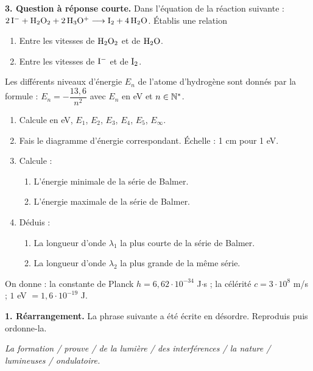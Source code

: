 \documentclass[11pt]{article}
\begin{document}
\medskip
\noindent\textbf{3. Question à réponse courte.} Dans l'équation de la réaction suivante : $\mathrm{2\,I^- + H_2O_2 + 2\,H_3O^+ \longrightarrow I_2 + 4\,H_2O}$. Établis une relation
\begin{enumerate}[label=\alph*.]
  \item Entre les vitesses de $\mathrm{H_2O_2}$ et de $\mathrm{H_2O}$.
  \item Entre les vitesses de $\mathrm{I^-}$ et de $\mathrm{I_2}$.
\end{enumerate}

Les différents niveaux d'énergie $E_n$ de l'atome d'hydrogène sont donnés par la formule : $E_n = -\dfrac{13{,}6}{n^2}$ avec $E_n$ en eV et $n \in \mathbb{N}^*$.

\begin{enumerate}
  \item Calcule en eV, $E_1$, $E_2$, $E_3$, $E_4$, $E_5$, $E_\infty$.
  \item Fais le diagramme d'énergie correspondant. Échelle : 1 cm pour 1 eV.
  \item Calcule :
  \begin{enumerate}[label=\alph*.]
    \item L'énergie minimale de la série de Balmer.
    \item L'énergie maximale de la série de Balmer.
  \end{enumerate}
  \item Déduis :
  \begin{enumerate}[label=\alph*.]
    \item La longueur d'onde $\lambda_1$ la plus courte de la série de Balmer.
    \item La longueur d'onde $\lambda_2$ la plus grande de la même série.
  \end{enumerate}
\end{enumerate}
\noindent On donne : la constante de Planck $h = 6{,}62\cdot10^{-34}$ J$\cdot$s ; la célérité $c = 3\cdot10^8$ m/s ; $1$ eV $= 1{,}6\cdot10^{-19}$ J.



\noindent\textbf{1. Réarrangement.} La phrase suivante a été écrite en désordre. Reproduis puis ordonne-la.

\textit{La formation / prouve / de la lumière / des interférences / la nature / lumineuses / ondulatoire.}
\end{document}
